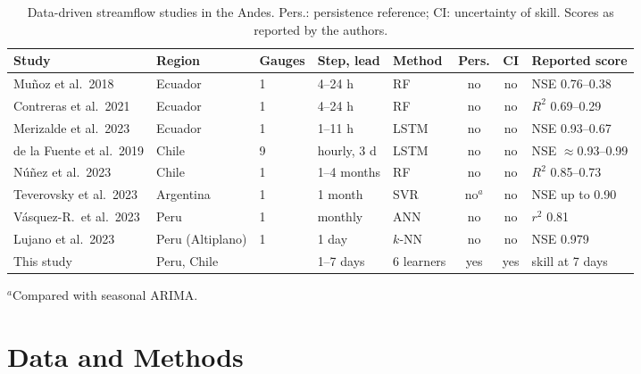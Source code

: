 \documentclass[graybox]{svmult}
\begin{document}
\begin{table}[tb]
\centering
\caption{Data-driven streamflow studies in the Andes. Pers.: persistence reference; CI: uncertainty of skill. Scores as reported by the authors.}
\label{tab:lit}
\scriptsize
\setlength{\tabcolsep}{2pt}
\begin{tabular}{lllllccl}
\toprule
Study & Region & Gauges & Step, lead & Method & Pers. & CI & Reported score \\
\midrule
Mu\~noz et al.\ 2018 \cite{munoz2018rf} & Ecuador & 1 & 4--24 h & RF & no & no & NSE 0.76--0.38 \\
Contreras et al.\ 2021 \cite{contreras2021rf} & Ecuador & 1 & 4--24 h & RF & no & no & $R^2$ 0.69--0.29 \\
Merizalde et al.\ 2023 \cite{merizalde2023lstm} & Ecuador & 1 & 1--11 h & LSTM & no & no & NSE 0.93--0.67 \\
de la Fuente et al.\ 2019 \cite{delafuente2019lstm} & Chile & 9 & hourly, 3 d & LSTM & no & no & NSE $\approx$0.93--0.99 \\
N\'u\~nez et al.\ 2023 \cite{nunez2023xai} & Chile & 1 & 1--4 months & RF & no & no & $R^2$ 0.85--0.73 \\
Teverovsky et al.\ 2023 \cite{teverovsky2023svr} & Argentina & 1 & 1 month & SVR & no$^a$ & no & NSE up to 0.90 \\
V\'asquez-R.\ et al.\ 2023 \cite{ramos2023crisnejas} & Peru & 1 & monthly & ANN & no & no & $r^2$ 0.81 \\
Lujano et al.\ 2023 \cite{quispe2023ramis} & Peru (Altiplano) & 1 & 1 day & $k$-NN & no & no & NSE 0.979 \\
\midrule
This study & Peru, Chile & \nGauges{} & 1--7 days & 6 learners & yes & yes & skill \medSkillSeven{} at 7 days \\
\bottomrule
\end{tabular}

\smallskip
{\scriptsize $^a$Compared with seasonal ARIMA.}
\end{table}

\section{Data and Methods}
\label{sec:data}
\end{document}
